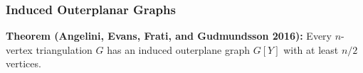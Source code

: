 \documentclass{beamer}
\begin{document}
\begin{frame}
  \frametitle{Induced Outerplanar Graphs}

  \textbf{Theorem (Angelini, Evans, Frati, and Gudmundsson 2016):}  Every $n$-vertex triangulation $G$ has an induced outerplane graph $G[Y]$ with at least $n/2$ vertices.
  \begin{center}

\end{center}
\end{frame}
\end{document}

